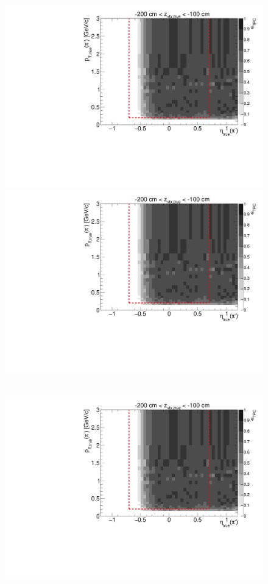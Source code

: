 \begin{figure}[hb]
{  \includegraphics[width=\linewidth,page=7]{graphics/eff/Eff2D_TPC_pion_Minus.pdf}\\
  \includegraphics[width=\linewidth,page=9]{graphics/eff/Eff2D_TPC_pion_Minus.pdf}
}~
\parbox{0.495\textwidth}{
  \centering
  \includegraphics[width=\linewidth,page=4]{graphics/eff/Eff2D_TPC_pion_Minus.pdf}\\
}
\end{figure}
